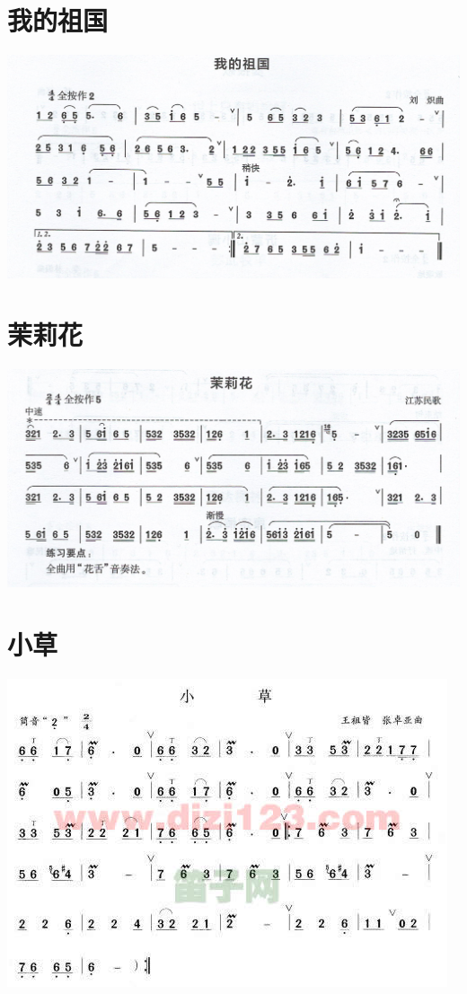 \documentclass[cn,pad,chinese,chinesefont=nofont]{elegantbook}
\begin{document}
\section{我的祖国}
\includegraphics[width=\textwidth]{dongxiao/Scan 19-1.jpeg}
\section{茉莉花}
\includegraphics[width=\textwidth]{dongxiao/Scan 19-2.jpeg}

\section{小草}
\includegraphics[width=\textwidth]{dongxiao/小草.jpg}
\end{document}
